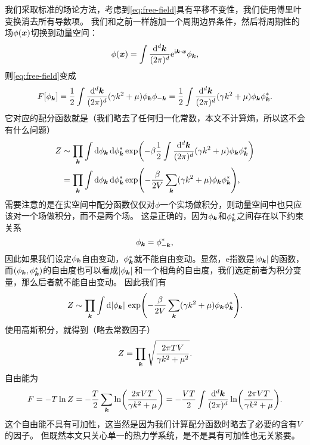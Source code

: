 \documentclass[hyperref, UTF8, a4paper]{ctexart}
\newcommand*{\ii}{\mathrm{i}}
\newcommand*{\ee}{\mathrm{e}}
\begin{document}
我们采取标准的场论方法，考虑到\eqref{eq:free-field}具有平移不变性，我们使用傅里叶变换消去所有导数项。
我们和之前一样施加一个周期边界条件，然后将周期性的场$\phi(\vb*{x})$切换到动量空间：
\begin{equation}
    \phi(\vb*{x}) = \int \frac{\dd[d]{\vb*{k}}}{(2\pi)^d} \ee^{\ii \vb*{k} \cdot \vb*{x}} \phi_{\vb*{k}},
\end{equation}
则\eqref{eq:free-field}变成
\begin{equation}
    F[\phi_{\vb*{k}}] = \frac{1}{2} \int \frac{\dd[d]{\vb*{k}}}{(2\pi)^d} (\gamma k^2 + \mu) \phi_{\vb*{k}} \phi_{-\vb*{k}} = \frac{1}{2} \int \frac{\dd[d]{\vb*{k}}}{(2\pi)^d} (\gamma k^2 + \mu) \phi_{\vb*{k}} \phi_{\vb*{k}}^*.
\end{equation}
它对应的配分函数就是（我们略去了任何归一化常数，本文不计算熵，所以这不会有什么问题）
\[
    \begin{aligned}
        Z &\sim \prod_{\vb*{k}} \int \dd{\phi_{\vb*{k}}} \dd{\phi_{\vb*{k}}^*} \exp(-\beta \frac{1}{2} \int \frac{\dd[d]{\vb*{k}}}{(2\pi)^d} (\gamma k^2 + \mu) \phi_{\vb*{k}} \phi_{\vb*{k}}^*) \\
        &= \prod_{\vb*{k}} \int \dd{\phi_{\vb*{k}}} \dd{\phi_{\vb*{k}}^*} \exp(- \frac{\beta}{2V} \sum_{\vb*{k}} (\gamma k^2 + \mu) \phi_{\vb*{k}} \phi_{\vb*{k}}^*) ,
    \end{aligned}
\]
需要注意的是在实空间中配分函数仅仅对$\phi$一个实场做积分，则动量空间中也只应该对一个场做积分，而不是两个场。
这是正确的，因为$\phi_{\vb*{k}}$和$\phi_{\vb*{k}}^*$之间存在以下约束关系
\[
    \phi_{\vb*{k}} = \phi_{-\vb*{k}}^*,
\]
因此如果我们设定$\phi_{\vb*{k}}$自由变动，$\phi_{\vb*{k}}^*$就不能自由变动。显然，$\ee$指数是$\abs*{\phi_{\vb*{k}}}$的函数，而$(\phi_{\vb*{k}}, \phi_{\vb*{k}}^*)$的自由度也可以看成$\abs*{\phi_{\vb*{k}}}$和一个相角的自由度，我们选定前者为积分变量，那么后者就不能自由变动。
因此我们有
\[
    Z \sim \prod_{\vb*{k}} \int \dd{\abs*{\phi_{\vb*{k}}}} \exp(- \frac{\beta}{2V} \sum_{\vb*{k}} (\gamma k^2 + \mu) \phi_{\vb*{k}} \phi_{\vb*{k}}^*).
\]
使用高斯积分，就得到（略去常数因子）
\begin{equation}
    Z = \prod_{\vb*{k}} \sqrt{\frac{2\pi T V}{\gamma k^2 + \mu^2}}.
\end{equation}
自由能为
\begin{equation}
    F = - T \ln Z = - \frac{T}{2} \sum_{\vb*{k}} \ln(\frac{2\pi V T}{\gamma k^2 + \mu}) = - \frac{V T}{2} \int \frac{\dd[d]{\vb*{k}}}{(2\pi)^d} \ln(\frac{2\pi V T}{\gamma k^2 + \mu}).
\end{equation}
这个自由能不具有可加性，这当然是因为我们计算配分函数时略去了必要的含有$V$的因子。
但既然本文只关心单一的热力学系统，是不是具有可加性也无关紧要。
\end{document}
